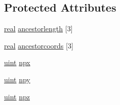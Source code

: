 \subsection*{Protected Attributes}
\begin{DoxyCompactItemize}
\item 
\mbox{\hyperlink{definitions_8h_aedc0ad84d1e764530814f57ad931d02a}{real}} \mbox{\hyperlink{classForest_a2891766e220c4e742c8dc14ac1ece629}{ancestorlength}} \mbox{[}3\mbox{]}
\item 
\mbox{\hyperlink{definitions_8h_aedc0ad84d1e764530814f57ad931d02a}{real}} \mbox{\hyperlink{classForest_a674b25321e648195b85e743c431a48d8}{ancestorcoords}} \mbox{[}3\mbox{]}
\item 
\mbox{\hyperlink{definitions_8h_a69aa29b598b851b0640aa225a9e5d61d}{uint}} \mbox{\hyperlink{classForest_a9e1897b90013d70653bcc63c2b5b4589}{npx}}
\item 
\mbox{\hyperlink{definitions_8h_a69aa29b598b851b0640aa225a9e5d61d}{uint}} \mbox{\hyperlink{classForest_a740e557b1d91cef196761afb65a6dc30}{npy}}
\item 
\mbox{\hyperlink{definitions_8h_a69aa29b598b851b0640aa225a9e5d61d}{uint}} \mbox{\hyperlink{classForest_a7778c276ec9566b1efa4b1aa8a136bf5}{npz}}
\end{DoxyCompactItemize}
